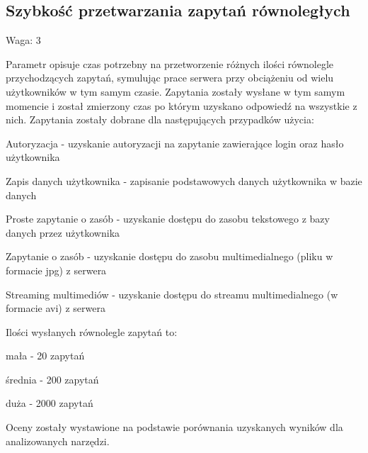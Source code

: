 \documentclass[12pt]{report}
\begin{document}
    \subsection{Szybkość przetwarzania zapytań równoległych}
      \begin{description}
        \item Waga: 3
      \end{description}
      Parametr opisuje czas potrzebny na przetworzenie różnych ilości równolegle przychodzących zapytań, symulując prace serwera przy obciążeniu od wielu użytkowników w tym samym czasie.
      Zapytania zostały wysłane w tym samym momencie i został zmierzony czas po którym uzyskano odpowiedź na wszystkie z nich.
      Zapytania zostały dobrane dla następujących przypadków użycia:
      \begin{description}
        \item Autoryzacja - uzyskanie autoryzacji na zapytanie zawierające login oraz hasło użytkownika
        \item Zapis danych użytkownika - zapisanie podstawowych danych użytkownika w bazie danych
        \item Proste zapytanie o zasób - uzyskanie dostępu do zasobu tekstowego z bazy danych przez użytkownika
        \item Zapytanie o zasób - uzyskanie dostępu do zasobu multimedialnego (pliku w formacie jpg) z serwera
        \item Streaming multimediów - uzyskanie dostępu do streamu multimedialnego (w formacie avi) z serwera
      \end{description}
      Ilości wysłanych równolegle zapytań to:
      \begin{description}
        \item mała - 20 zapytań
        \item średnia - 200 zapytań
        \item duża - 2000 zapytań
      \end{description}
      Oceny zostały wystawione na podstawie porównania uzyskanych wyników dla analizowanych narzędzi.
\end{document}
